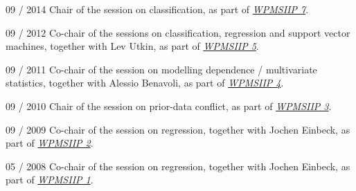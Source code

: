 \documentclass[a4paper]{simplecv}
\begin{document}
\begin{topic}
\item[09 / 2014] Chair of the session on classification,
                 as part of \emph{\href{http://users.ugent.be/~slopatat/wpmsiip2014/index.html}{WPMSIIP 7}}.

\item[09 / 2012] Co-chair of the sessions on classification, regression and support vector machines, together with Lev Utkin,
                 as part of \emph{\href{http://www.statistik.lmu.de/institut/ag/statsoz_neu/research/WPMSIIP_2012/}{WPMSIIP 5}}.

\item[09 / 2011] Co-chair of the session on modelling dependence / multivariate statistics, together with Alessio Benavoli,
                 as part of \emph{\href{http://wpmsiip2011.fdvinfo.net/c/646/Information/}{WPMSIIP 4}}.

\item[09 / 2010] Chair of the session on prior-data conflict,
                 as part of \emph{\href{http://www.maths.dur.ac.uk/users/matthias.troffaes/wpmsiip2010/}{WPMSIIP 3}}.

\item[09 / 2009] Co-chair of the session on regression, together with Jochen Einbeck,
                 as part of \emph{\href{http://www.stat.uni-muenchen.de/~walter/workshop0909/}{WPMSIIP 2}}.

\item[05 / 2008] Co-chair of the session on regression, together with Jochen Einbeck,
                 as part of \emph{\href{http://www.maths.dur.ac.uk/users/matthias.troffaes/workshopip2008/index.html}{WPMSIIP 1}}.
\end{topic}
\end{document}

